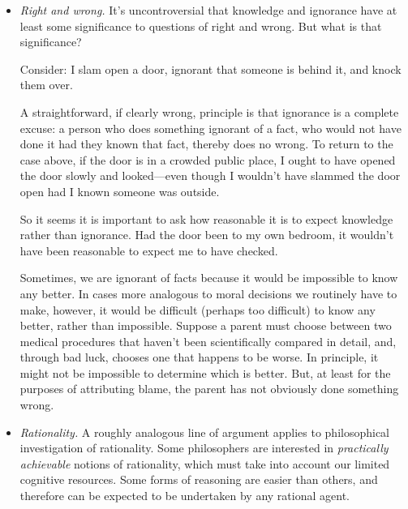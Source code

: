 \begin{itemize}
    \item \emph{Right and wrong.} It’s uncontroversial that knowledge and ignorance have at least some significance to questions of right and wrong. But what is that significance?

    Consider: I slam open a door, ignorant that someone is behind it, and knock them over.
    
    A straightforward, if clearly wrong, principle is that ignorance is a complete excuse: a person who does something ignorant of a fact, who would not have done it had they known that fact, thereby does no wrong. To return to the case above, if the door is in a crowded public place, I ought to have opened the door slowly and looked—even though I wouldn’t have slammed the door open had I known someone was outside.
    
    So it seems it is important to ask how reasonable it is to expect knowledge rather than ignorance. Had the door been to my own bedroom, it wouldn’t have been reasonable to expect me to have checked.

    Sometimes, we are ignorant of facts because it would be impossible to know any better. In cases more analogous to moral decisions we routinely have to make, however, it would be difficult (perhaps too difficult) to know any better, rather than impossible. Suppose a parent must choose between two medical procedures that haven’t been scientifically compared in detail, and, through bad luck, chooses one that happens to be worse. In principle, it might not be impossible to determine which is better. But, at least for the purposes of attributing blame, the parent has not obviously done something wrong.
    \item \emph{Rationality.} A roughly analogous line of argument applies to philosophical investigation of rationality. Some philosophers are interested in \emph{practically achievable} notions of rationality, which must take into account our limited cognitive resources. Some forms of reasoning are easier than others, and therefore can be expected to be undertaken by any rational agent.
    

\end{itemize}
